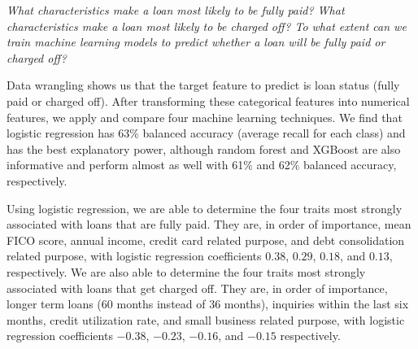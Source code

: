 \documentclass[11pt]{article}
\begin{document}
\begin{flushleft}
{\em What characteristics make a loan most likely to be fully paid?
What characteristics make a loan most likely to be charged off?
To what extent can we train machine learning models to predict whether a	loan will be fully paid or charged off?}
\end{flushleft}

Data wrangling shows us that the target feature to predict is loan status
(fully paid or charged off). After transforming these categorical features
into numerical features, we apply and compare four machine learning techniques.
We find that logistic regression has 63\% balanced accuracy (average recall for
each class) and has the best explanatory power, although random forest and
XGBoost are also informative and perform almost as well with 61\% and 62\%
balanced accuracy, respectively.

Using logistic regression, we are able to determine the four traits most
strongly associated with loans that are fully paid. They are, in order of
importance, mean FICO score, annual income, credit card related purpose,
and debt consolidation related purpose, with logistic regression coefficients
$0.38$, $0.29$, $0.18$, and $0.13$, respectively.
We are also able to determine the four traits most strongly
associated with loans that get charged off. They are, in order of importance,
longer term loans (60 months instead of 36 months), inquiries within the last
six months, credit utilization rate, and small business related purpose,
with logistic regression coefficients $-0.38$, $-0.23$, $-0.16$, and $-0.15$
respectively.
\end{document}
